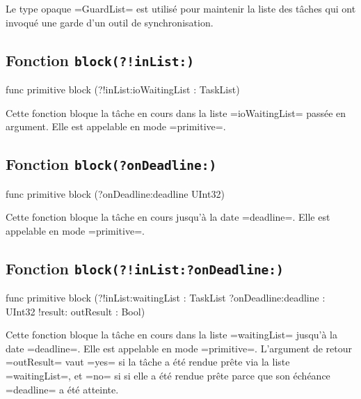 Le type opaque \plm=GuardList= est utilisé pour maintenir la liste des tâches qui ont invoqué une garde d'un outil de synchronisation.



\subsection{Fonction \texttt{block(?!inList{}:)}}

\begin{PLM}
func primitive block (?!inList:ioWaitingList : TaskList)
\end{PLM}

Cette fonction bloque la tâche en cours dans la liste \plm=ioWaitingList= passée en argument. Elle est appelable en mode \plm=primitive=.




\subsection{Fonction \texttt{block(?onDeadline{}:)}}

\begin{PLM}
func primitive block (?onDeadline:deadline UInt32) 
\end{PLM}

Cette fonction bloque la tâche en cours jusqu'à la date \plm=deadline=. Elle est appelable en mode \plm=primitive=.







\subsection{Fonction \texttt{block(?!inList{}:?onDeadline{}:)}}

\begin{PLM}
func primitive block (?!inList:waitingList : TaskList 
                      ?onDeadline:deadline : UInt32
                      !result: outResult : Bool) 
\end{PLM}

Cette fonction bloque la tâche en cours dans la liste \plm=waitingList= jusqu'à la date \plm=deadline=. Elle est appelable en mode \plm=primitive=. L'argument de retour \plm=outResult= vaut \plm=yes= si la tâche a été rendue prête via la liste \plm=waitingList=, et \plm=no= si si elle a été rendue prête parce que son échéance \plm=deadline= a été atteinte.








